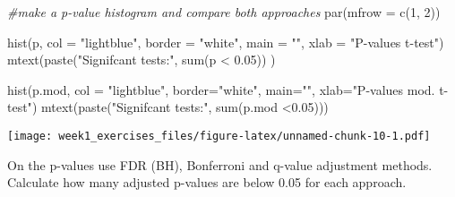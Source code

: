 \documentclass[
]{article}
\newenvironment{Shaded}{\begin{snugshade}}{\end{snugshade}}
\newcommand{\AttributeTok}[1]{\textcolor[rgb]{0.77,0.63,0.00}{#1}}
\newcommand{\CommentTok}[1]{\textcolor[rgb]{0.56,0.35,0.01}{\textit{#1}}}
\newcommand{\DecValTok}[1]{\textcolor[rgb]{0.00,0.00,0.81}{#1}}
\newcommand{\FloatTok}[1]{\textcolor[rgb]{0.00,0.00,0.81}{#1}}
\newcommand{\FunctionTok}[1]{\textcolor[rgb]{0.00,0.00,0.00}{#1}}
\newcommand{\NormalTok}[1]{#1}
\newcommand{\OtherTok}[1]{\textcolor[rgb]{0.56,0.35,0.01}{#1}}
\newcommand{\SpecialCharTok}[1]{\textcolor[rgb]{0.00,0.00,0.00}{#1}}
\newcommand{\StringTok}[1]{\textcolor[rgb]{0.31,0.60,0.02}{#1}}
\begin{document}
\begin{Shaded}
\begin{Highlighting}[]
\CommentTok{\#make a p{-}value histogram and compare both approaches}
\FunctionTok{par}\NormalTok{(}\AttributeTok{mfrow =} \FunctionTok{c}\NormalTok{(}\DecValTok{1}\NormalTok{, }\DecValTok{2}\NormalTok{))}

\FunctionTok{hist}\NormalTok{(p, }\AttributeTok{col =} \StringTok{"lightblue"}\NormalTok{, }\AttributeTok{border =} \StringTok{"white"}\NormalTok{, }\AttributeTok{main =} \StringTok{""}\NormalTok{,}
     \AttributeTok{xlab =} \StringTok{"P{-}values t{-}test"}\NormalTok{)}
\FunctionTok{mtext}\NormalTok{(}\FunctionTok{paste}\NormalTok{(}\StringTok{"Signifcant tests:"}\NormalTok{, }\FunctionTok{sum}\NormalTok{(p }\SpecialCharTok{\textless{}} \FloatTok{0.05}\NormalTok{))  )}

\FunctionTok{hist}\NormalTok{(p.mod, }\AttributeTok{col =} \StringTok{"lightblue"}\NormalTok{, }\AttributeTok{border=}\StringTok{"white"}\NormalTok{, }\AttributeTok{main=}\StringTok{""}\NormalTok{,}
     \AttributeTok{xlab=}\StringTok{"P{-}values mod. t{-}test"}\NormalTok{)}
\FunctionTok{mtext}\NormalTok{(}\FunctionTok{paste}\NormalTok{(}\StringTok{"Signifcant tests:"}\NormalTok{, }\FunctionTok{sum}\NormalTok{(p.mod }\SpecialCharTok{\textless{}}\FloatTok{0.05}\NormalTok{)))}
\end{Highlighting}
\end{Shaded}

\texttt{[image: week1\_exercises\_files/figure-latex/unnamed-chunk-10-1.pdf]}

On the p-values use FDR (BH), Bonferroni and q-value adjustment methods.
Calculate how many adjusted p-values are below 0.05 for each approach.

\begin{Shaded}
\end{Shaded}
\end{document}
